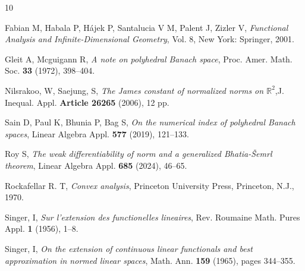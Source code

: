 \documentclass{amsart}
\theoremstyle{definition}
\theoremstyle{remark}
\numberwithin{equation}{section}
\begin{document}

\begin{thebibliography}{10}

 Fabian M, Habala P, H\'{a}jek P, Santalucia V M, Palent J, Zizler V, \textit{Functional Analysis and Infinite-Dimensional Geometry}, Vol. 8, New York: Springer, 2001.

 Gleit A, Mcguigann R, \textit{A note on polyhedral Banach space}, Proc. Amer. Math. Soc. \textbf{33} (1972), 398--404.

 Nilsrakoo, W, Saejung, S, \textit{The James constant of normalized norms on $\mathbb{R}^2$},J. Inequal. Appl. \textbf{Article 26265} (2006), 12 pp.

 Sain D, Paul K, Bhunia P, Bag S, \textit{On the numerical index of polyhedral Banach spaces}, Linear Algebra Appl. \textbf{577} (2019), 121--133.

 Roy S, \textit{The weak differentiability of norm and a generalized Bhatia-\v{S}emrl theorem}, Linear Algebra Appl. \textbf{685} (2024), 46--65.

 Rockafellar R. T, \textit{Convex analysis}, Princeton University Press, Princeton, N.J., 1970.

 Singer, I, \textit{Sur l'extension des functionelles lineaires}, Rev. Roumaine Math. Pures Appl. \textbf{1} (1956), 1--8.

 Singer, I, \textit{On the extension of continuous linear functionals and best approximation in normed linear spaces}, Math. Ann. \textbf{159} (1965), pages 344--355.



\end{thebibliography}
\end{document}

